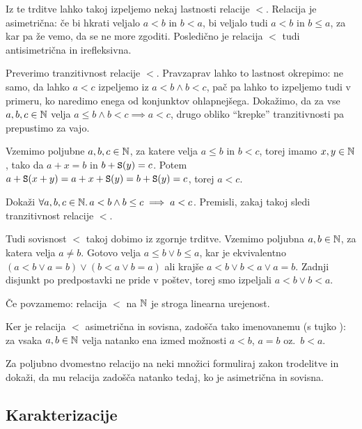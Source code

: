 Iz te trditve lahko takoj izpeljemo nekaj lastnosti relacije $<$. Relacija je asimetrična: če bi hkrati veljalo $a < b$ in $b < a$, bi veljalo tudi $a < b$ in $b \leq a$, za kar pa že vemo, da se ne more zgoditi. Posledično je relacija $<$ tudi antisimetrična in irefleksivna. 

Preverimo tranzitivnost relacije $<$. Pravzaprav lahko to lastnost okrepimo: ne samo, da lahko $a < c$ izpeljemo iz $a < b \land b < c$, pač pa lahko to izpeljemo tudi v primeru, ko naredimo enega od konjunktov ohlapnejšega. Dokažimo, da za vse $a, b, c \in \mathbb{N}$ velja $a \leq b \land b < c \implies a < c$, drugo obliko ``krepke'' tranzitivnosti pa prepustimo za vajo.

Vzemimo poljubne $a, b, c \in \mathbb{N}$, za katere velja $a \leq b$ in $b < c$, torej imamo $x, y \in \mathbb{N}$, tako da $a + x = b$ in $b + \mathtt{S}(y) = c$. Potem $a + \mathtt{S}(x + y) = a + x + \mathtt{S}(y) = b + \mathtt{S}(y) = c$, torej $a < c$.

\begin{naloga}
Dokaži $\forall a, b, c \in \mathbb{N} .\,{a < b \land b \leq c \implies a < c}$. Premisli, zakaj takoj sledi tranzitivnost relacije $<$.
\end{naloga}

Tudi sovisnost $<$ takoj dobimo iz zgornje trditve. Vzemimo poljubna $a, b \in \mathbb{N}$, za katera velja $a \neq b$. Gotovo velja $a \leq b \lor b \leq a$, kar je ekvivalentno $(a < b \lor a = b) \lor (b < a \lor b = a)$ ali krajše $a < b \lor b < a \lor a = b$. Zadnji disjunkt po predpostavki ne pride v poštev, torej smo izpeljali $a < b \lor b < a$.

Če povzamemo: relacija $<$ na $\mathbb{N}$ je stroga linearna urejenost.

Ker je relacija $<$ asimetrična in sovisna, zadošča tako imenovanemu  (s tujko ): za vsaka $a, b \in \mathbb{N}$ velja natanko ena izmed možnosti $a < b$, $a = b$ oz.~$b < a$.

\begin{naloga}
Za poljubno dvomestno relacijo na neki množici formuliraj zakon trodelitve in dokaži, da mu relacija zadošča natanko tedaj, ko je asimetrična in sovisna.
\end{naloga}

\subsection{Karakterizacije}

